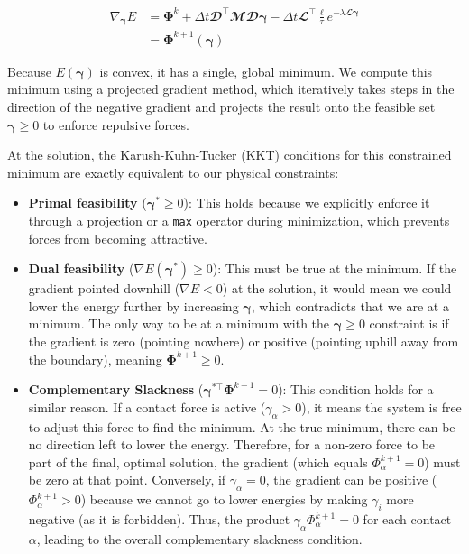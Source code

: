 \documentclass[conference]{IEEEtran}
\begin{document}
\begin{equation}
    \begin{split}
        \nabla_{\boldsymbol{\gamma}} E & = \boldsymbol{\Phi}^k + \Delta t \mathbfcal{D}^\top \mathbfcal{M} \mathbfcal{D} \boldsymbol{\gamma} - \Delta t \mathbfcal{L}^\top \frac{\boldsymbol{\ell}}{\tau} e^{-\lambda \mathbfcal{L} \boldsymbol{\gamma}} \\
        & = \boldsymbol{\Phi}^{k+1}(\boldsymbol{\gamma})
    \end{split}
\end{equation}

Because $E(\boldsymbol{\gamma}) $ is convex, it has a single, global minimum. We compute this minimum using a projected gradient method, which iteratively takes steps in the direction of the negative gradient and projects the result onto the feasible set $\boldsymbol{\gamma} \ge 0$ to enforce repulsive forces.

At the solution, the Karush-Kuhn-Tucker (KKT) conditions for this constrained minimum are exactly equivalent to our physical constraints:

\begin{itemize}
    \item \textbf{Primal feasibility} ($ \boldsymbol{\gamma}^* \ge 0 $): This holds because we explicitly enforce it through a projection or a \texttt{max} operator during minimization, which prevents forces from becoming attractive.

    \item \textbf{Dual feasibility} ($ \nabla E(\boldsymbol{\gamma}^*) \ge 0 $): This must be true at the minimum. If the gradient pointed downhill ($ \nabla E < 0 $) at the solution, it would mean we could lower the energy further by increasing $ \boldsymbol{\gamma} $, which contradicts that we are at a minimum. The only way to be at a minimum with the $ \boldsymbol{\gamma} \ge 0 $ constraint is if the gradient is zero (pointing nowhere) or positive (pointing uphill away from the boundary), meaning $ \boldsymbol{\Phi}^{k+1} \ge 0 $.

    \item \textbf{Complementary Slackness}  ($ \boldsymbol{\gamma}^{*\top} \boldsymbol{\Phi}^{k+1} = 0 $): This condition holds for a similar reason. If a contact force is active ($ \gamma_\alpha > 0$), it means the system is free to adjust this force to find the minimum. At the true minimum, there can be no direction left to lower the energy. Therefore, for a non-zero force to be part of the final, optimal solution, the gradient (which equals $\Phi^{k+1}_\alpha = 0$) must be zero at that point. Conversely, if $ \gamma_\alpha = 0 $, the gradient can be positive ($ \Phi^{k+1}_\alpha > 0 $) because we cannot go to lower energies by making $ \gamma_i $ more negative (as it is forbidden). Thus, the product $ \gamma_\alpha \Phi^{k+1}_\alpha = 0 $ for each contact $\alpha$, leading to the overall complementary slackness condition.

\end{itemize}
\end{document}

